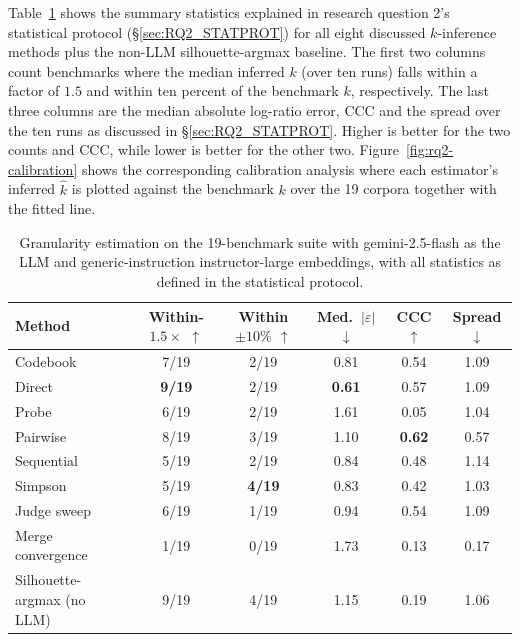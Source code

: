 \documentclass[11pt,a4paper,oneside]{report}
\begin{document}
Table~\ref{tab:rq2-scoreboard} shows the summary statistics explained in research question 2's statistical protocol (\S\ref{sec:RQ2_STATPROT}) for all eight discussed $k$-inference methods plus the non-LLM silhouette-argmax baseline. The first two columns count benchmarks where the median inferred $k$ (over ten runs) falls within a factor of $1.5$ and within ten percent of the benchmark $k$, respectively. The last three columns are the median absolute log-ratio error, CCC and the spread over the ten runs as discussed in \S\ref{sec:RQ2_STATPROT}. Higher is better for the two counts and CCC, while lower is better for the other two. Figure~\ref{fig:rq2-calibration} shows the corresponding calibration analysis where each estimator's inferred $\hat{k}$ is plotted against the benchmark $k$ over the 19 corpora together with the fitted line.

\begin{table}[htbp]
\centering
\small
\begin{tabular}{lccccc}
\toprule
Method & Within-$1.5\times$ $\uparrow$ & Within $\pm10\%$ $\uparrow$ & Med.\ $|\varepsilon|$ $\downarrow$ & CCC $\uparrow$ & Spread $\downarrow$ \\
\midrule
Codebook & 7/19 & 2/19 & 0.81 & 0.54 & 1.09 \\
Direct & \textbf{9/19} & 2/19 & \textbf{0.61} & 0.57 & 1.09 \\
Probe & 6/19 & 2/19 & 1.61 & 0.05 & 1.04 \\
Pairwise & 8/19 & 3/19 & 1.10 & \textbf{0.62} & 0.57 \\
Sequential & 5/19 & 2/19 & 0.84 & 0.48 & 1.14 \\
Simpson & 5/19 & \textbf{4/19} & 0.83 & 0.42 & 1.03 \\
Judge sweep & 6/19 & 1/19 & 0.94 & 0.54 & 1.09 \\
Merge convergence & 1/19 & 0/19 & 1.73 & 0.13 & 0.17 \\
\midrule
Silhouette-argmax (no LLM) & 9/19 & 4/19 & 1.15 & 0.19 & 1.06 \\
\bottomrule
\end{tabular}
\caption[Granularity estimation scoreboard]{Granularity estimation on the
19-benchmark suite with {\small\ttfamily gemini-2.5-flash} as the LLM and
generic-instruction {\small\ttfamily instructor-large} embeddings, with all
statistics as defined in the statistical protocol.}
\label{tab:rq2-scoreboard}
\end{table}
\end{document}
